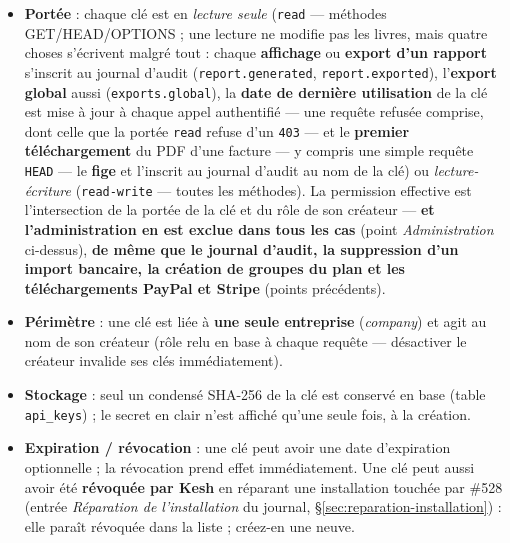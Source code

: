 \documentclass[a4paper,11pt,oneside]{article}
\begin{document}
\begin{itemize}
    \item \textbf{Portée} : chaque clé est en \emph{lecture seule} (\texttt{read} --- méthodes GET/HEAD/OPTIONS ; une lecture ne modifie pas les livres, mais quatre choses s'écrivent malgré tout : chaque \textbf{affichage} ou \textbf{export d'un rapport} s'inscrit au journal d'audit (\texttt{report.\allowbreak generated}, \texttt{report.\allowbreak exported}), l'\textbf{export global} aussi (\texttt{exports.global}), la \textbf{date de dernière utilisation} de la clé est mise à jour à chaque appel authentifié --- une requête refusée comprise, dont celle que la portée \texttt{read} refuse d'un \texttt{403} --- et le \textbf{premier téléchargement} du PDF d'une facture --- y compris une simple requête \texttt{HEAD} --- le \textbf{fige} et l'inscrit au journal d'audit au nom de la clé) ou \emph{lecture-écriture} (\texttt{read-write} --- toutes les méthodes). La permission effective est l'intersection de la portée de la clé et du rôle de son créateur --- \textbf{et l'administration en est exclue dans tous les cas} (point \emph{Administration} ci-dessus), \textbf{de même que le journal d'audit, la suppression d'un import bancaire, la création de groupes du plan et les téléchargements PayPal et Stripe} (points précédents).
    \item \textbf{Périmètre} : une clé est liée à \textbf{une seule entreprise} (\emph{company}) et agit au nom de son créateur (rôle relu en base à chaque requête --- désactiver le créateur invalide ses clés immédiatement).
    \item \textbf{Stockage} : seul un condensé SHA-256 de la clé est conservé en base (table \texttt{api\_keys}) ; le secret en clair n'est affiché qu'une seule fois, à la création.
    \item \textbf{Expiration / révocation} : une clé peut avoir une date d'expiration optionnelle ; la révocation prend effet immédiatement. Une clé peut aussi avoir été \textbf{révoquée par Kesh} en réparant une installation touchée par \#528 (entrée \emph{Réparation de l'installation} du journal, \S\ref{sec:reparation-installation}) : elle paraît révoquée dans la liste ; créez-en une neuve.

\end{itemize}
\end{document}
